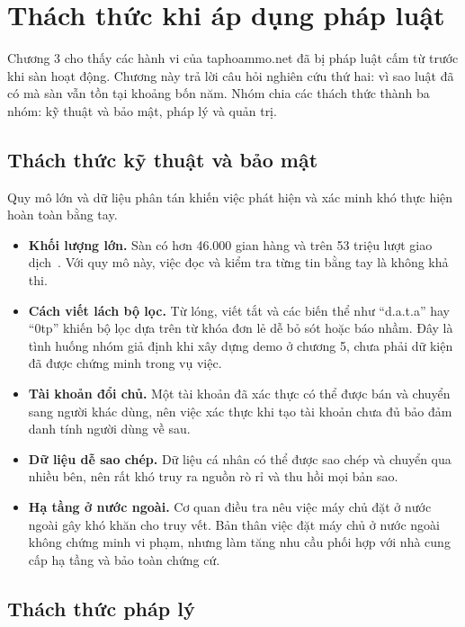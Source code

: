 \section{Thách thức khi áp dụng pháp luật}\label{sec:4}

Chương 3 cho thấy các hành vi của taphoammo.net đã bị pháp luật cấm từ trước khi sàn hoạt động. Chương này trả lời câu hỏi nghiên cứu thứ hai: vì sao luật đã có mà sàn vẫn tồn tại khoảng bốn năm. Nhóm chia các thách thức thành ba nhóm: kỹ thuật và bảo mật, pháp lý và quản trị.

\subsection{Thách thức kỹ thuật và bảo mật}\label{sec:4.1}

Quy mô lớn và dữ liệu phân tán khiến việc phát hiện và xác minh khó thực hiện hoàn toàn bằng tay.

\begin{itemize}
\item \textbf{Khối lượng lớn.} Sàn có hơn 46.000 gian hàng và trên 53 triệu lượt giao dịch~\cite{bca-2026}. Với quy mô này, việc đọc và kiểm tra từng tin bằng tay là không khả thi.
\item \textbf{Cách viết lách bộ lọc.} Từ lóng, viết tắt và các biến thể như “d.a.t.a” hay “0tp” khiến bộ lọc dựa trên từ khóa đơn lẻ dễ bỏ sót hoặc báo nhầm. Đây là tình huống nhóm giả định khi xây dựng demo ở chương 5, chưa phải dữ kiện đã được chứng minh trong vụ việc.
\item \textbf{Tài khoản đổi chủ.} Một tài khoản đã xác thực có thể được bán và chuyển sang người khác dùng, nên việc xác thực khi tạo tài khoản chưa đủ bảo đảm danh tính người dùng về sau.
\item \textbf{Dữ liệu dễ sao chép.} Dữ liệu cá nhân có thể được sao chép và chuyển qua nhiều bên, nên rất khó truy ra nguồn rò rỉ và thu hồi mọi bản sao.
\item \textbf{Hạ tầng ở nước ngoài.} Cơ quan điều tra nêu việc máy chủ đặt ở nước ngoài gây khó khăn cho truy vết. Bản thân việc đặt máy chủ ở nước ngoài không chứng minh vi phạm, nhưng làm tăng nhu cầu phối hợp với nhà cung cấp hạ tầng và bảo toàn chứng cứ.
\end{itemize}
\subsection{Thách thức pháp lý}\label{sec:4.2}

